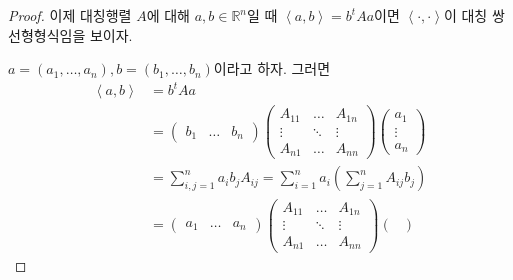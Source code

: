 \documentclass[unfonts,oneside,a4paper]{oblivoir}
\theoremstyle{definition}
\theoremstyle{theorem}
\theoremstyle{theorem}
\theoremstyle{remark}
\theoremstyle{remark}
\theoremstyle{remark}
\theoremstyle{remark}
\renewcommand{\vec}[1]{\bm{\mathit{#1}}}
\begin{document}
\begin{proof}
    이제 대칭행렬 $A$에 대해 $\vec a, \vec b \in \mathbb R^n$일 때 $\left<\vec a, \vec b\right> = \vec b^t A \vec a$이면 $\left<\cdot, \cdot\right>$이 대칭 쌍선형형식임을 보이자.

    $\vec a = (a_1, \dots, a_n), \vec b = (b_1, \dots, b_n)$이라고 하자.
    그러면
    \begin{align*}
        \left<\vec a, \vec b\right> &= \vec b^t A \vec a\\
                                    &=
                                    \begin{pmatrix}
                                        b_1 & \dots & b_n
                                    \end{pmatrix}
                                    \begin{pmatrix}
                                        A_{11} & \dots & A_{1n}\\
                                        \vdots & \ddots & \vdots\\
                                        A_{n1} & \dots & A_{nn}
                                    \end{pmatrix}
                                    \begin{pmatrix}
                                        a_1\\
                                        \vdots\\
                                        a_n
                                    \end{pmatrix}\\
                                    &= \sum_{i, j = 1}^n a_i b_j A_{ij} = \sum_{i = 1}^n a_i \left(\sum_{j = 1}^n A_{ij} b_j\right)\\
                                    &=
                                    \begin{pmatrix}
                                        a_1 & \dots & a_n
                                    \end{pmatrix}
                                    \begin{pmatrix}
                                        A_{11} & \dots & A_{1n}\\
                                        \vdots & \ddots & \vdots\\
                                        A_{n1} & \dots & A_{nn}
                                    \end{pmatrix}
                                    \begin{pmatrix}

\end{pmatrix}
\end{align*}
\end{proof}
\end{document}
